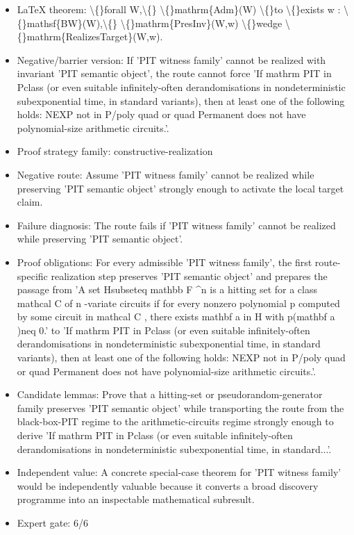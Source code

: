 \documentclass[11pt]{article}
\begin{document}
\begin{itemize}
\item LaTeX theorem: \textbackslash\{\}forall W,\textbackslash\{\} \textbackslash\{\}mathrm\{Adm\}(W) \textbackslash\{\}to \textbackslash\{\}exists w : \textbackslash\{\}mathsf\{BW\}(W),\textbackslash\{\} \textbackslash\{\}mathrm\{PresInv\}(W,w) \textbackslash\{\}wedge \textbackslash\{\}mathrm\{RealizesTarget\}(W,w).
\item Negative/barrier version: If 'PIT witness family' cannot be realized with invariant 'PIT semantic object', the route cannot force 'If mathrm PIT in Pclass (or even suitable infinitely-often derandomisations in nondeterministic subexponential time, in standard variants), then at least one of the following holds: NEXP not in P/poly quad or quad Permanent does not have polynomial-size arithmetic circuits.'.
\item Proof strategy family: constructive-realization
\item Negative route: Assume 'PIT witness family' cannot be realized while preserving 'PIT semantic object' strongly enough to activate the local target claim.
\item Failure diagnosis: The route fails if 'PIT witness family' cannot be realized while preserving 'PIT semantic object'.
\item Proof obligations: For every admissible 'PIT witness family', the first route-specific realization step preserves 'PIT semantic object' and prepares the passage from 'A set Hsubseteq mathbb F \textasciicircum{}n is a hitting set for a class mathcal C of n -variate circuits if for every nonzero polynomial p computed by some circuit in mathcal C , there exists mathbf a in H with p(mathbf a )neq 0.' to 'If mathrm PIT in Pclass (or even suitable infinitely-often derandomisations in nondeterministic subexponential time, in standard variants), then at least one of the following holds: NEXP not in P/poly quad or quad Permanent does not have polynomial-size arithmetic circuits.'.
\item Candidate lemmas: Prove that a hitting-set or pseudorandom-generator family preserves 'PIT semantic object' while transporting the route from the black-box-PIT regime to the arithmetic-circuits regime strongly enough to derive 'If mathrm PIT in Pclass (or even suitable infinitely-often derandomisations in nondeterministic subexponential time, in standard...'.
\item Independent value: A concrete special-case theorem for 'PIT witness family' would be independently valuable because it converts a broad discovery programme into an inspectable mathematical subresult.
\item Expert gate: 6/6
\end{itemize}
\end{document}
